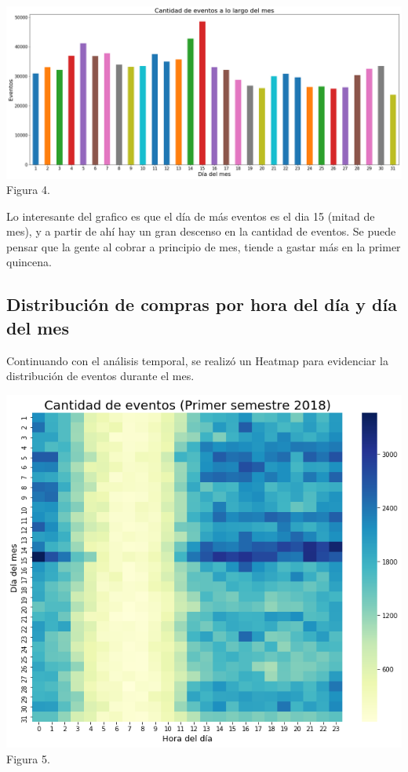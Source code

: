 \documentclass[a4paper ,12pt]{article}
\begin{document}
\begin{center}
	\includegraphics[width=1.1\linewidth]{output_21_1}
	Figura 4.
	
\end{center}

Lo interesante del grafico es que el día de más eventos es el dia 15 (mitad de mes), y a partir de ahí hay un gran descenso en la cantidad de eventos. Se puede pensar que la gente al cobrar a principio de mes, tiende a gastar más en la primer quincena.

\newpage
\subsection{Distribución de compras por hora del día y día del mes}
Continuando con el análisis temporal, se realizó un Heatmap para evidenciar la distribución de eventos durante el mes.

\begin{center}
	\includegraphics[width=1.1\linewidth]{output_24_1}
	Figura 5.
	
	\end{center}
\end{document}
